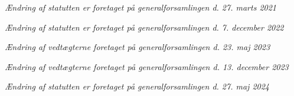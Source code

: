 \documentclass[10pt, danish]{article}
\begin{document}
	\textit{Ændring af statutten er foretaget på generalforsamlingen d. 27. marts 2021}
	
	\noindent
	\textit{Ændring af statutten er foretaget på generalforsamlingen d. 7. december 2022}
	
	\noindent
	\textit{Ændring af vedtægterne foretaget på generalforsamlingen d. 23. maj 2023}
	
	\noindent
	\textit{Ændring af vedtægterne foretaget på generalforsamlingen d. 13. december 2023}
	
	\noindent
	\textit{Ændring af statutten er foretaget på generalforsamlingen d. 27. maj 2024}
	
	
	
\end{document}

